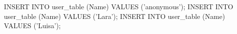 INSERT INTO user_table (Name) VALUES ('anonymous');
INSERT INTO user_table (Name) VALUES ('Lara');
INSERT INTO user_table (Name) VALUES ('Luisa');